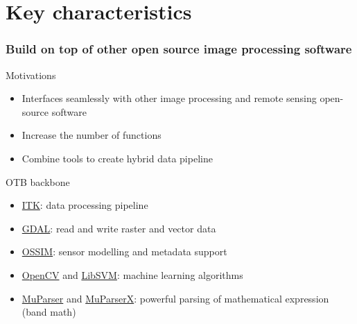 \documentclass[8pt]{beamer}
\begin{document}
\section{Key characteristics}

\begin{frame}
\frametitle{Build on top of other open source image processing software}
\begin{block}{Motivations}
\begin{itemize}
\item Interfaces seamlessly with other image processing and remote sensing open-source software
\item Increase the number of functions
\item Combine tools to create hybrid data pipeline
\end{itemize}
\end{block}

\begin{block}{OTB backbone}
\begin{itemize}
\item \href{www.itk.org}{ITK}: data processing pipeline
\item \href{www.gdal.org}{GDAL}: read and write raster and vector data
\item \href{www.ossim.org}{OSSIM}: sensor modelling and metadata support
\item \href{www.opencv.org}{OpenCV} and \href{www.libsvm.org}{LibSVM}: machine learning algorithms
\item \href{www.muparser.org}{MuParser} and \href{www.muparserx.org}{MuParserX}:
  powerful parsing of mathematical expression (band math)
\end{itemize}
\end{block}

\end{frame}
\end{document}
